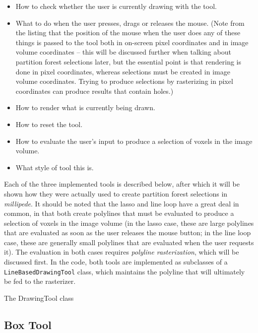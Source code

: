 \begin{itemize}

\item How to check whether the user is currently drawing with the tool.
\item What to do when the user presses, drags or releases the mouse. (Note from the listing that the position of the mouse when the user does any of these things is passed to the tool both in on-screen pixel coordinates and in image volume coordinates -- this will be discussed further when talking about partition forest selections later, but the essential point is that rendering is done in pixel coordinates, whereas selections must be created in image volume coordinates. Trying to produce selections by rasterizing in pixel coordinates can produce results that contain holes.)
\item How to render what is currently being drawn.
\item How to reset the tool.
\item How to evaluate the user's input to produce a selection of voxels in the image volume.
\item What style of tool this is.

\end{itemize}
%
Each of the three implemented tools is described below, after which it will be shown how they were actually used to create partition forest selections in \emph{millipede}. It should be noted that the lasso and line loop have a great deal in common, in that both create polylines that must be evaluated to produce a selection of voxels in the image volume (in the lasso case, these are large polylines that are evaluated as soon as the user releases the mouse button; in the line loop case, these are generally small polylines that are evaluated when the user requests it). The evaluation in both cases requires \emph{polyline rasterization}, which will be discussed first. In the code, both tools are implemented as subclasses of a \texttt{LineBasedDrawingTool} class, which maintains the polyline that will ultimately be fed to the rasterizer.

\begin{stulisting}[p]
\caption{The DrawingTool class}
\label{code:appendixval-drawingtool}

\end{stulisting}

\subsection{Box Tool}

